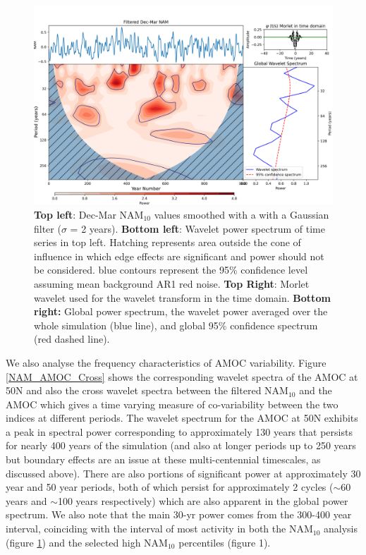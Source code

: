 \begin{figure}[h!]
\begin{center}
\noindent\includegraphics[width = 0.8\linewidth]{Figures/Figures-surface/NAM_wavelet_UKESM.png}
\caption{\textbf{Top left}: Dec-Mar NAM$_{10}$ values smoothed with a with a Gaussian filter ($\sigma$ = 2 years). \textbf{Bottom left}: Wavelet power spectrum of time series in top left. Hatching represents area outside the cone of influence in which edge effects are significant and power should not be considered. blue contours represent the 95\% confidence level assuming mean background AR1 red noise. \textbf{Top Right}: Morlet wavelet used for the wavelet transform in the time domain. \textbf{Bottom right:} Global power spectrum, the wavelet power averaged over the whole simulation (blue line), and global 95\% confidence spectrum (red dashed line).}
\label{NAM_wavelet}
\end{center}
\end{figure}

We also analyse the frequency characteristics of AMOC variability. Figure \ref{NAM_AMOC_Cross} shows the corresponding wavelet spectra of the AMOC at 50N and also the cross wavelet spectra between the filtered NAM$_{10}$ and the AMOC which gives a time varying measure of co-variability between the two indices at different periods. The wavelet spectrum for the AMOC at 50N exhibits a peak in spectral power corresponding to approximately 130 years that persists for nearly 400 years of the simulation (and also at longer periods up to 250 years but boundary effects are an issue at these multi-centennial timescales, as discussed above). There are also portions of significant power at approximately 30 year and 50 year periods, both of which persist for approximately 2 cycles ($\sim$60 years and $\sim$100 years respectively) which are also apparent in the global power spectrum. We also note that the main 30-yr power comes from the 300-400 year interval, coinciding with the interval of most activity in both the NAM$_{10}$ analysis (figure \ref{NAM_wavelet}) and the selected high NAM$_{10}$ percentiles (figure 1). 
 
